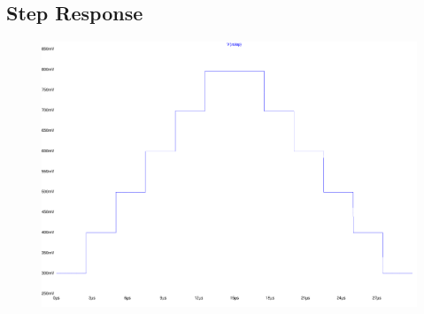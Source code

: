 \subsection{Step Response}

\begin{figure}[h]
	\centering
	\includegraphics[width=\textwidth]{./images/StepResponse-out.pdf}
	\caption{}
	\label{fig:step}
\end{figure}
